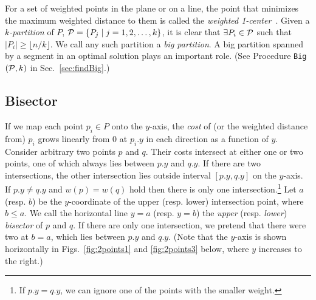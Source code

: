 \documentclass[preprint,10pt]{elsarticle}
\begin{document}
For a set of weighted points in the plane or on a line,
the point that minimizes the maximum weighted distance to
them is called the {\em weighted 1-center}~\cite{bhattacharya2007}.
Given a {\em $k$-partition} of $P$, 
${\cal P}= \{P_j \mid j = 1, 2, \ldots, k\}$,
it is clear that $\exists P_i \in {\cal P}$ such that $|P_i| \geq \lfloor n/k\rfloor$.
We call any such partition a {\em big partition}.
A big partition spanned by a segment in an optimal solution plays an important role.
(See Procedure {\tt Big$({\cal P}, k)$} in Sec.~\ref{sec:findBig}.)


\subsection{Bisector}\label{sec:bisector}
If we map each point $p_i\in P$ onto the $y$-axis,
the {\em cost} of (or the weighted distance from) $p_i$
grows linearly from 0 at $p_i.y$ in each direction as a function of $y$.
Consider arbitrary two points $p$ and $q$.
Their costs intersect at either one or two points,
one of which always lies between $p.y$ and $q.y$.
If there are two intersections,
the other intersection lies outside interval $[p.y,q.y]$ on the $y$-axis.
If $p.y\not=q.y$ and $w(p)=w(q)$ hold
then there is only one intersection.\footnote{If $p.y=q.y$,
we can ignore one of the points with the smaller weight.
}
Let $a$ (resp. $b$) be the $y$-coordinate of the upper (resp. lower) intersection point,
where $b\leq a$.
We call the horizontal line $y=a$ (resp. $y=b$)
the {\em upper} (resp. {\em lower}) {\em bisector} of $p$ and $q$.
If there are only one intersection,
we pretend that there were two at $b=a$, which lies between $p.y$ and $q.y$.
(Note that the $y$-axis is shown horizontally in Figs.~\ref{fig:2points1} and \ref{fig:2points3} below,
where $y$ increases to the right.)
\end{document}

